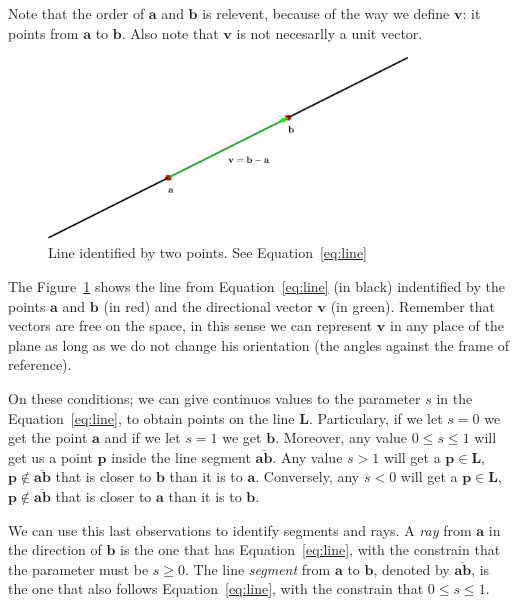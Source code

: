 Note that the order of $\mathbf{a}$ and $\mathbf{b}$ is relevent, because of the way we define $\mathbf{v}$: it points from $\mathbf{a}$ to $\mathbf{b}$.
Also note that $\mathbf{v}$ is not necesarlly a unit vector. 

\begin{figure}[htb]
  \centering
  \includegraphics[width=0.85\textwidth]{img/line}
  \caption{Line identified by two points. See Equation~\ref{eq:line} }
  \label{fig:line}
\end{figure}

The Figure~\ref{fig:line} shows the line from Equation~\ref{eq:line} (in black) indentified by the points $\mathbf{a}$ and $\mathbf{b}$ (in red) and the directional vector $\mathbf{v}$ (in green).
Remember that vectors are free on the space, in this sense we can represent $\mathbf{v}$ in any place of the plane as long as we do not change his orientation (the angles against the frame of reference).


On these conditions; we can give continuos values to the parameter $s$ in the Equation~\ref{eq:line}, to obtain points on the line $\mathbf{L}$.
Particulary, if we let $s = 0$ we get the point $\mathbf{a}$ and if we let $s = 1$ we get  
$\mathbf{b}$.
Moreover, any value $0 \leq s \leq 1$ will get us a point $\mathbf{p}$ inside the line segment $\overline{\mathbf{a} \mathbf{b}}$.
Any value $s > 1$ will get a $\mathbf{p} \in \mathbf{L}$, $\mathbf{p} \notin \overline{\mathbf{a} \mathbf{b}}$ that is closer to $\mathbf{b}$ than it is to $\mathbf{a}$.
Conversely, any $s < 0$ will get a $\mathbf{p} \in \mathbf{L}$, $\mathbf{p} \notin \overline{\mathbf{a} \mathbf{b}}$ that is closer to $\mathbf{a}$ than it is to $\mathbf{b}$.

We can use this last observations to identify segments and rays.
A \emph{ray} from $\mathbf{a}$ in the direction of $\mathbf{b}$ is the one that has Equation~\ref{eq:line}, with the constrain that the parameter must be $s \geq 0$.
The line \emph{segment} from $\mathbf{a}$ to $\mathbf{b}$, denoted by $\overline{\mathbf{a} \mathbf{b}}$, is the one that also follows Equation~\ref{eq:line}, with the constrain that   $0 \leq s \leq 1$.


